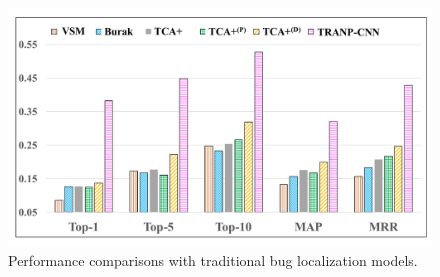 \begin{figure}[hbt]
\centering
\includegraphics[width = \columnwidth]{pic/results3_avg.pdf}
\caption{Performance comparisons with traditional bug localization models.}
\label{fig:results3}
\end{figure}


